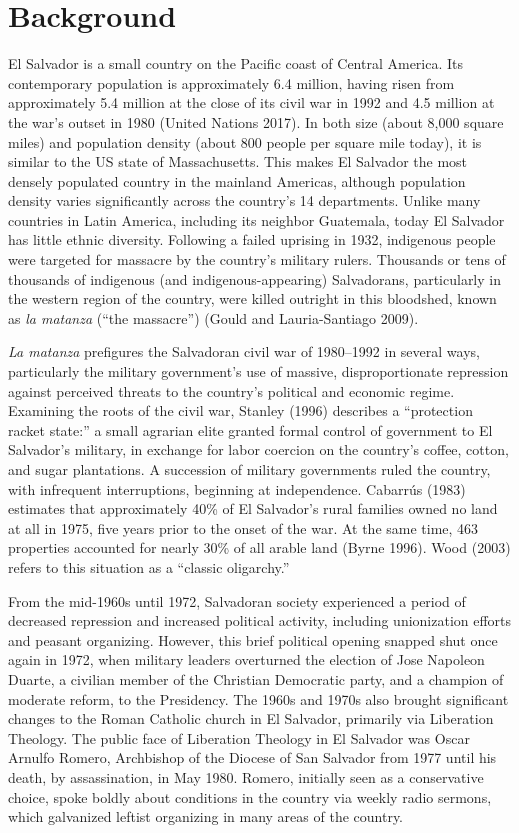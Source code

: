\documentclass[11pt,]{article}
\begin{document}
\hypertarget{background}{%
\section{Background}\label{background}}

El Salvador is a small country on the Pacific coast of Central America.
Its contemporary population is approximately 6.4 million, having risen
from approximately 5.4 million at the close of its civil war in 1992 and
4.5 million at the war's outset in 1980 (United Nations 2017). In both
size (about 8,000 square miles) and population density (about 800 people
per square mile today), it is similar to the US state of Massachusetts.
This makes El Salvador the most densely populated country in the
mainland Americas, although population density varies significantly
across the country's 14 departments. Unlike many countries in Latin
America, including its neighbor Guatemala, today El Salvador has little
ethnic diversity. Following a failed uprising in 1932, indigenous people
were targeted for massacre by the country's military rulers. Thousands
or tens of thousands of indigenous (and indigenous-appearing)
Salvadorans, particularly in the western region of the country, were
killed outright in this bloodshed, known as \emph{la matanza} (``the
massacre'') (Gould and Lauria-Santiago 2009).

\emph{La matanza} prefigures the Salvadoran civil war of 1980--1992 in
several ways, particularly the military government's use of massive,
disproportionate repression against perceived threats to the country's
political and economic regime. Examining the roots of the civil war,
Stanley (1996) describes a ``protection racket state:'' a small agrarian
elite granted formal control of government to El Salvador's military, in
exchange for labor coercion on the country's coffee, cotton, and sugar
plantations. A succession of military governments ruled the country,
with infrequent interruptions, beginning at independence. Cabarrús
(1983) estimates that approximately 40\% of El Salvador's rural families
owned no land at all in 1975, five years prior to the onset of the war.
At the same time, 463 properties accounted for nearly 30\% of all arable
land (Byrne 1996). Wood (2003) refers to this situation as a ``classic
oligarchy.''

From the mid-1960s until 1972, Salvadoran society experienced a period
of decreased repression and increased political activity, including
unionization efforts and peasant organizing. However, this brief
political opening snapped shut once again in 1972, when military leaders
overturned the election of Jose Napoleon Duarte, a civilian member of
the Christian Democratic party, and a champion of moderate reform, to
the Presidency. The 1960s and 1970s also brought significant changes to
the Roman Catholic church in El Salvador, primarily via Liberation
Theology. The public face of Liberation Theology in El Salvador was
Oscar Arnulfo Romero, Archbishop of the Diocese of San Salvador from
1977 until his death, by assassination, in May 1980. Romero, initially
seen as a conservative choice, spoke boldly about conditions in the
country via weekly radio sermons, which galvanized leftist organizing in
many areas of the country.
\end{document}

